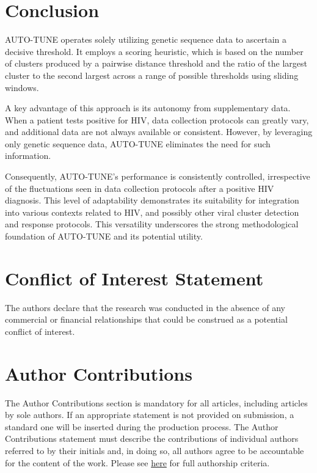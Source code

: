 \documentclass[utf8]{FrontiersinHarvard} %
\begin{document}
\section{Conclusion}

AUTO-TUNE operates solely utilizing genetic sequence data to ascertain a
decisive threshold. It employs a scoring heuristic, which is based on the number
of clusters produced by a pairwise distance threshold and the ratio of the
largest cluster to the second largest across a range of possible thresholds
using sliding windows.

A key advantage of this approach is its autonomy from supplementary data. When a
patient tests positive for HIV, data collection protocols can greatly vary, and
additional data are not always available or consistent. However, by leveraging
only genetic sequence data, AUTO-TUNE eliminates the need for such information.

Consequently, AUTO-TUNE's performance is consistently controlled, irrespective
of the fluctuations seen in data collection protocols after a positive HIV
diagnosis. This level of adaptability demonstrates its suitability for
integration into various contexts related to HIV, and possibly other viral
cluster detection and response protocols. This versatility underscores the
strong methodological foundation of AUTO-TUNE and its potential utility.


\section*{Conflict of Interest Statement}

The authors declare that the research was conducted in the absence of any commercial or financial relationships that could be construed as a potential conflict of interest.

\section*{Author Contributions}

The Author Contributions section is mandatory for all articles, including articles by sole authors. If an appropriate statement is not provided on submission, a standard one will be inserted during the production process. The Author Contributions statement must describe the contributions of individual authors referred to by their initials and, in doing so, all authors agree to be accountable for the content of the work. Please see  \href{https://www.frontiersin.org/guidelines/policies-and-publication-ethics#authorship-and-author-responsibilities}{here} for full authorship criteria.
\end{document}

